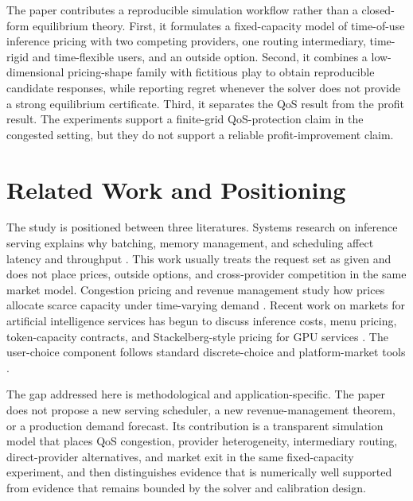 \documentclass[11pt,a4paper]{article}
\begin{document}
The paper contributes a reproducible simulation workflow rather than a closed-form equilibrium theory. First, it formulates a fixed-capacity model of time-of-use inference pricing with two competing providers, one routing intermediary, time-rigid and time-flexible users, and an outside option. Second, it combines a low-dimensional pricing-shape family with fictitious play to obtain reproducible candidate responses, while reporting regret whenever the solver does not provide a strong equilibrium certificate. Third, it separates the QoS result from the profit result. The experiments support a finite-grid QoS-protection claim in the congested setting, but they do not support a reliable profit-improvement claim.

\section{Related Work and Positioning}
\label{sec:related}

The study is positioned between three literatures. Systems research on inference serving explains why batching, memory management, and scheduling affect latency and throughput \cite{crankshaw2017clipper,gujarati2020clockwork,romero2021infaas,yu2022orca,li2023alpaserve,sheng2023flexgen,kwon2023pagedattention,agrawal2024sarathiserve,patel2024splitwise,zhong2024distserve,agrawal2024vidur}. This work usually treats the request set as given and does not place prices, outside options, and cross-provider competition in the same market model. Congestion pricing and revenue management study how prices allocate scarce capacity under time-varying demand \cite{vickrey1969congestion,arnott1990bottleneck,gallego1994dynamic,elmaghraby2003dynamic,bitran2003overview,talluri2004revenue,phillips2005pricing}. Recent work on markets for artificial intelligence services has begun to discuss inference costs, menu pricing, token-capacity contracts, and Stackelberg-style pricing for GPU services \cite{demirer2025emerging,erdil2025inference,bergemann2025menu,guo2026prillm,yan2026stackelberg,cunningham2026token,liu2026locational}. The user-choice component follows standard discrete-choice and platform-market tools \cite{mcfadden1974conditional,anderson1992discrete,train2009discrete,rochet2003platform}.

The gap addressed here is methodological and application-specific. The paper does not propose a new serving scheduler, a new revenue-management theorem, or a production demand forecast. Its contribution is a transparent simulation model that places QoS congestion, provider heterogeneity, intermediary routing, direct-provider alternatives, and market exit in the same fixed-capacity experiment, and then distinguishes evidence that is numerically well supported from evidence that remains bounded by the solver and calibration design.
\end{document}

